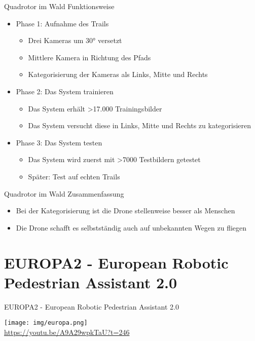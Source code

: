 \documentclass[aspectratio=1610]{beamer}
\begin{document}
  \begin{frame}{Quadrotor im Wald}
  Funktionsweise
  	\begin{itemize}
  		\item Phase 1: Aufnahme des Trails
  		\begin{itemize}
  			\item Drei Kameras um 30° versetzt
  			\item Mittlere Kamera in Richtung des Pfads
  			\item Kategorisierung der Kameras als Links, Mitte und Rechts
  		\end{itemize}
  		\pause
  		\item Phase 2: Das System trainieren
  		\begin{itemize}
  			\item Das System erhält >17.000 Trainingsbilder
  			\item Das System versucht diese in Links, Mitte und Rechts zu kategorisieren
  		\end{itemize}
  		\pause
  		\item Phase 3: Das System testen
  		\begin{itemize}
  			\item Das System wird zuerst mit >7000 Testbildern getestet
  			\item Später: Test auf echten Trails
  		\end{itemize}
  	\end{itemize}
  \end{frame}
  
  \begin{frame}{Quadrotor im Wald}
  	Zusammenfassung
  	\begin{itemize}
  		\item Bei der Kategorisierung ist die Drone stellenweise besser als Menschen
  		\pause
  		\item Die Drone schafft es selbstständig auch auf unbekannten Wegen zu fliegen
  		
  	\end{itemize}
  \end{frame}
  
  \section{EUROPA2 - European Robotic Pedestrian Assistant 2.0}
  \begin{frame}{EUROPA2 - European Robotic Pedestrian Assistant 2.0}
  	\begin{center}
  		\texttt{[image: img/europa.png]} \\
  		\url{https://youtu.be/A9A29wpkTaU?t=246}
  	\end{center}
  \end{frame}
  
\end{document}
